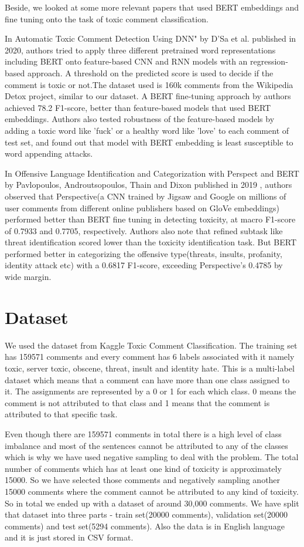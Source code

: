 \documentclass[sigconf]{acmart}
\begin{document}
Beside, we looked at some more relevant papers that used BERT embeddings and fine tuning onto the task of toxic comment classification.

In Automatic Toxic Comment Detection Using DNN" by D'Sa et al. \cite{d2019towards} published in 2020, authors tried to apply three different pretrained word representations including BERT onto feature-based CNN and RNN models with an regression-based approach. A threshold on the predicted score is used to decide if the comment is toxic or not.The dataset used is 160k comments from the Wikipedia Detox project, similar to our dataset. A BERT fine-tuning approach by authors achieved 78.2 F1-score, better than feature-based models that used BERT embeddings. Authors also tested robustness of the feature-based models by adding a toxic word like 'fuck' or a healthy word like 'love' to each comment of test set, and found out that model with BERT embedding is least susceptible to word appending attacks.

In Offensive Language Identification and Categorization with Perspect and BERT by Pavlopoulos, Androutsopoulos, Thain and Dixon published in 2019 \cite{pavlopoulos2019convai}, authors observed that Perspective(a CNN trained by Jigsaw and Google on millions of user comments from different online publishers based on GloVe embeddings) performed better than BERT fine tuning in detecting toxicity, at macro F1-score of 0.7933 and 0.7705, respectively. Authors also note that refined subtask like threat identification scored lower than the toxicity identification task. But BERT performed better in categorizing the offensive type(threats, insults, profanity, identity attack etc) with a 0.6817 F1-score, exceeding Perspective's 0.4785 by wide margin.

\section{Dataset}

We used the dataset from Kaggle Toxic Comment Classification. The training set has 159571 comments and every comment has 6 labels associated with it namely toxic, server toxic, obscene, threat, insult and identity hate. This is a multi-label dataset which means that a comment can have more than one class assigned to it. The assignments are represented by a 0 or 1 for each which class. 0 means the comment is not attributed to that class and 1 means that the comment is attributed to that specific task.

Even though there are 159571 comments in total there is a high level of class imbalance and most of the sentences cannot be attributed to any of the classes which is why we have used negative sampling to deal with the problem. The total number of comments which has at least one kind of toxicity is approximately 15000. So we have selected those comments and negatively sampling another 15000 comments where the comment cannot be attributed to any kind of toxicity. So in total we ended up with a dataset of around 30,000 comments. We have split that dataset into three parts - train set(20000 comments), validation set(20000 comments) and test set(5294 comments). Also the data is in English language and it is just stored in CSV format.
\end{document}
